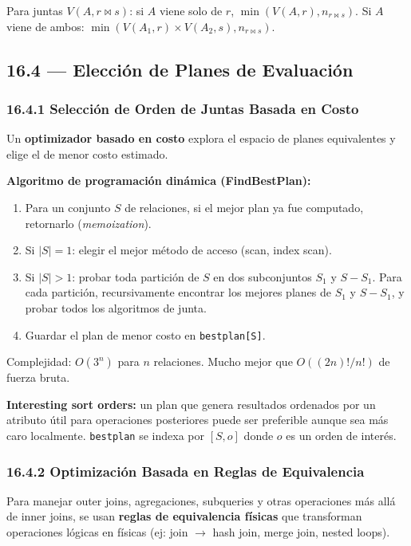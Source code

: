 \documentclass[11pt, a4paper]{article}
\begin{document}
Para juntas $V(A, r \bowtie s)$: si $A$ viene solo de $r$, $\min(V(A,r), n_{r \bowtie s})$. Si $A$ viene de ambos: $\min(V(A_1,r) \times V(A_2,s), n_{r \bowtie s})$.

\subsection{16.4 --- Elección de Planes de Evaluación}

\subsubsection{16.4.1 Selección de Orden de Juntas Basada en Costo}

Un \textbf{optimizador basado en costo} explora el espacio de planes equivalentes y elige el de menor costo estimado.

\textbf{Algoritmo de programación dinámica (FindBestPlan):}
\begin{enumerate}[nosep]
	\item Para un conjunto $S$ de relaciones, si el mejor plan ya fue computado, retornarlo (\textit{memoization}).
	\item Si $|S| = 1$: elegir el mejor método de acceso (scan, index scan).
	\item Si $|S| > 1$: probar toda partición de $S$ en dos subconjuntos $S_1$ y $S - S_1$. Para cada partición, recursivamente encontrar los mejores planes de $S_1$ y $S - S_1$, y probar todos los algoritmos de junta.
	\item Guardar el plan de menor costo en \texttt{bestplan[S]}.
\end{enumerate}

Complejidad: $O(3^n)$ para $n$ relaciones. Mucho mejor que $O((2n)!/n!)$ de fuerza bruta.

\textbf{Interesting sort orders:} un plan que genera resultados ordenados por un atributo útil para operaciones posteriores puede ser preferible aunque sea más caro localmente. \texttt{bestplan} se indexa por $[S, o]$ donde $o$ es un orden de interés.

\subsubsection{16.4.2 Optimización Basada en Reglas de Equivalencia}

Para manejar outer joins, agregaciones, subqueries y otras operaciones más allá de inner joins, se usan \textbf{reglas de equivalencia físicas} que transforman operaciones lógicas en físicas (ej: join $\to$ hash join, merge join, nested loops).
\end{document}
